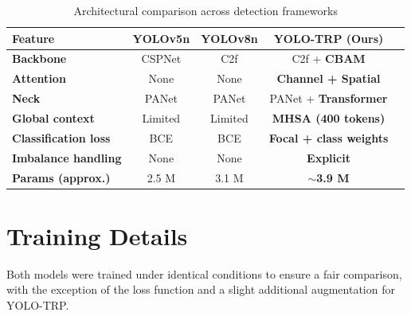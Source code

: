 \documentclass[12pt, a4paper]{article}
\begin{document}
\begin{table}[H]
\centering
\caption{Architectural comparison across detection frameworks}
\label{tab:arch_compare}
\renewcommand{\arraystretch}{1.35}
\begin{tabular}{>{\bfseries}lcccc}
\toprule
Feature & YOLOv5n & YOLOv8n & \textbf{YOLO-TRP (Ours)} \\
\midrule
Backbone         & CSPNet          & C2f                 & C2f + \textbf{CBAM}              \\
Attention        & None            & None                & \textbf{Channel + Spatial}       \\
Neck             & PANet           & PANet               & PANet + \textbf{Transformer}     \\
Global context   & Limited         & Limited             & \textbf{MHSA (400 tokens)}       \\
Classification loss & BCE          & BCE                 & \textbf{Focal + class weights}   \\
Imbalance handling & None         & None                & \textbf{Explicit}                \\
Params (approx.) & 2.5 M          & 3.1 M               & \textbf{$\sim$3.9 M}             \\
\bottomrule
\end{tabular}
\end{table}

\section{Training Details}

Both models were trained under identical conditions to ensure a fair comparison, with the exception of the loss function and a slight additional augmentation for YOLO-TRP.
\end{document}
